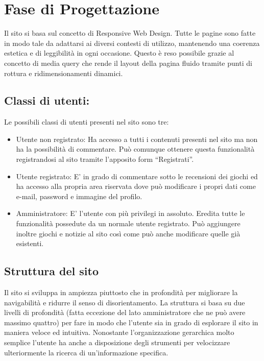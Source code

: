 \section{ Fase di Progettazione}

Il sito si basa sul concetto di Responsive Web Design. Tutte le pagine sono fatte in modo tale da adattarsi ai diversi contesti di utilizzo, mantenendo una coerenza estetica e di leggibilità in ogni occasione. Questo è reso possibile grazie al concetto di media query che rende il layout della pagina fluido tramite punti di rottura e ridimensionamenti dinamici.  


\subsection{Classi di utenti:}
Le possibili classi di utenti presenti nel sito sono tre:
\begin{itemize}
	\item Utente non registrato: Ha accesso a tutti i contenuti presenti nel sito ma non ha la possibilità di commentare. Può comunque ottenere questa funzionalità registrandosi al sito tramite l'apposito form “Registrati”.
	\item Utente registrato: E' in grado di commentare sotto le recensioni dei giochi ed ha accesso alla propria area riservata dove può modificare i propri dati come e-mail, password e immagine del profilo.
	\item Amministratore: E' l'utente con più privilegi in assoluto. Eredita tutte le funzionalità possedute da un normale utente registrato. Può aggiungere inoltre giochi e notizie al sito così come può anche modificare quelle già esistenti.
\end{itemize}

\subsection{Struttura del sito}

Il sito si sviluppa in ampiezza piuttosto che in profondità per migliorare la navigabilità e ridurre il senso di disorientamento. La struttura si basa su due livelli di profondità (fatta eccezione del lato amministratore che ne può avere massimo quattro) per fare in modo che l'utente sia in grado di esplorare il sito in maniera veloce ed intuitiva. Nonostante l'organizzazione gerarchica molto semplice l'utente ha anche a disposizione degli strumenti per velocizzare ulteriormente la ricerca di un'informazione specifica.

